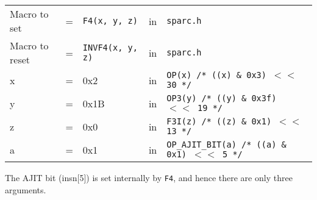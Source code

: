 \begin{enumerate}
  \begin{tabular}[h]{lclcl}
    Macro to set  &=& \texttt{F4(x, y, z)} &in& \texttt{sparc.h}     \\
    Macro to reset  &=& \texttt{INVF4(x, y, z)} &in& \texttt{sparc.h}     \\
    x &=& 0x2      &in& \texttt{OP(x)  /* ((x) \& 0x3)  $<<$ 30 */} \\
    y &=& 0x1B     &in& \texttt{OP3(y) /* ((y) \& 0x3f) $<<$ 19 */} \\
    z &=& 0x0      &in& \texttt{F3I(z) /* ((z) \& 0x1)  $<<$ 13 */} \\
    a &=& 0x1      &in& \texttt{OP\_AJIT\_BIT(a) /* ((a) \& 0x1)  $<<$ 5 */}
  \end{tabular}

  The AJIT bit  (insn[5]) is set internally by  \texttt{F4}, and hence
  there are only three arguments.


\end{enumerate}
